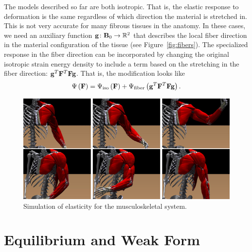 The models described so far are both isotropic. That is, the elastic response to deformation is the same regardless of which direction the material is stretched in. This is not very accurate for many fibrous tissues in the anatomy. In these cases, we need an auxiliary function $\mathbf{g} \colon \mathbf{B}_0 \to \mathbb{R}^2$ that describes the local fiber direction in the material configuration of the tissue (see Figure~\ref{fig:fibers}). The specialized response in the fiber direction can be incorporated by changing the original isotropic strain energy density to include a term based on the stretching in the fiber direction: $\mathbf{g}^T \mathbf{F}^T \mathbf{F} \mathbf{g}$. That is, the modification looks like
\begin{equation*}
\Psi \left( \mathbf{F} \right) = \Psi_{\text{iso}} \left( \mathbf{F} \right) + \Psi_{\text{fiber}} \left( \mathbf{g}^T \mathbf{F}^T \mathbf{F} \mathbf{g} \right).
\end{equation*}

\begin{figure}
\includegraphics[width=\columnwidth]{images/muscles}
\caption{Simulation of elasticity for the musculoskeletal system.}
\end{figure}

\section{Equilibrium and Weak Form}

